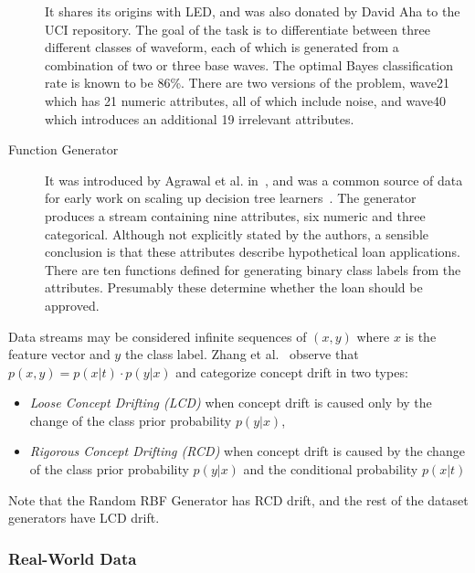 \begin{description}
It shares its origins with { LED}, and was also donated by David Aha
to the UCI repository. The goal of the task is to differentiate between three
different classes of waveform, each of which is generated from a combination
of two or three base waves. The optimal Bayes classification rate is known
to be 86\%. There are two versions of the problem, wave21 which has 21 numeric
attributes, all of which include noise, and wave40 which introduces an additional 19
irrelevant attributes.
 \item[Function Generator] %
It was introduced by Agrawal et al. in~\cite{agrawal}, and was a common
source of data for early work on scaling up decision tree learners~\cite{dbmine,sliq, sprint,rainforest}.
The generator produces a stream containing nine attributes, six numeric and 
three categorical. Although not explicitly stated by the authors, a sensible 
conclusion is that these attributes describe hypothetical loan applications.
There are ten functions defined for generating binary class labels from the
attributes. 
Presumably these determine whether the loan should be approved. 
\ENDOMIT
 \end{description}
Data streams may be considered infinite sequences of $(x,y)$ where $x$ is the feature vector and $y$
the class label. Zhang et al.~\cite{Zhang08} observe that $ p(x,y) = p(x|t) \cdot p(y|x) $ and categorize concept drift in two types:
\begin{itemize}
\item \emph{Loose Concept Drifting (LCD)} when concept drift is caused only by the change of the class prior probability $p(y|x)$, %
\item  \emph{Rigorous Concept Drifting (RCD)} when concept drift is caused by the change of the class prior probability $p(y|x)$ and the conditional probability $p(x|t)$  
\end{itemize}

Note that the Random RBF Generator has RCD drift, and the rest of the dataset generators have LCD drift.

\subsubsection{Real-World Data}



